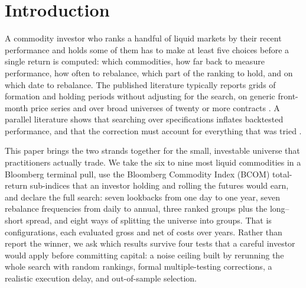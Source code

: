\documentclass[commodities,article,submit,pdftex,moreauthors]{Definitions/mdpi}
\begin{document}
\section{Introduction}

A commodity investor who ranks a handful of liquid markets by their recent performance and holds some of them has to make at least five choices before a single return is computed: which commodities, how far back to measure performance, how often to rebalance, which part of the ranking to hold, and on which date to rebalance. The published literature typically reports grids of formation and holding periods without adjusting for the search, on generic front-month price series and over broad universes of twenty or more contracts \citep{miffre2007,shen2007,fuertes2010,zhang2020}. A parallel literature shows that searching over specifications inflates backtested performance, and that the correction must account for everything that was tried \citep{sullivan1999,white2000,hansen2005,romano2005,bailey2014,harvey2016}.

This paper brings the two strands together for the small, investable universe that practitioners actually trade. We take the six to nine most liquid commodities in a Bloomberg terminal pull, use the Bloomberg Commodity Index (BCOM) total-return sub-indices that an investor holding and rolling the futures would earn, and declare the full search: seven lookbacks from one day to one year, seven rebalance frequencies from daily to annual, three ranked groups plus the long--short spread, and eight ways of splitting the universe into groups. That is \nConfigs{} configurations, each evaluated gross and net of costs over \evalYears{} years. Rather than report the winner, we ask which results survive four tests that a careful investor would apply before committing capital: a noise ceiling built by rerunning the whole search with random rankings, formal multiple-testing corrections, a realistic execution delay, and out-of-sample selection.
\end{document}
